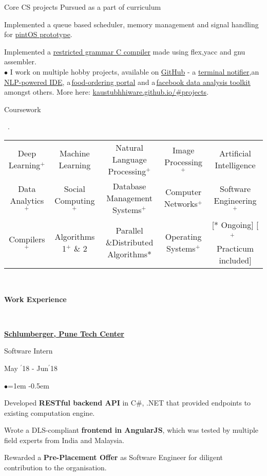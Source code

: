 \documentclass[11pt, a4paper]{resume}
\newcommand{\important}[1]{
  \textcolor{mypurple}{#1}
}
\newcommand{\fillit}[1]{
  \leavevmode\xleaders\hbox{#1}\hfill\kern0pt
}
\newcommand{\sectionTitle}[1]{
  \begin{Large}
      \important{\textbf{#1}} 
    \end{Large}
    \important{\rlap{\rule[.5ex]{\linegoal}{0.5pt}}{}}
     \vspace{0.1em}\\
}
\newcommand{\sectionSubtitleX}[1]{
  \begin{large}
    \important{#1}
    \end{large}
    \fillit{\important{.}}
}
\newcommand{\textbox}[1]{
  \parbox{.333\textwidth}{#1}
}
\newenvironment{Jobsection}[3]{ %
\noindent\textbox{\bf #1\hfill}\textbox{\hfil #2\hfil}\textbox{\hfill #3}
  \begin{list}{$\bullet$}{\leftmargin=1em} %
   \itemsep -0.5em \vspace{-0.5em} %
  }{
  \end{list}
  \vspace{0.2em} %
}
\begin{document}
\begin{rSubsection}{Core CS projects}{\hspace*{\fill} Pursued as a part of curriculum}{}{}
\item Implemented a queue based scheduler, memory management and signal handling for \href{https://github.com/kaustubhhiware/OSLab}{pintOS prototype}.
\item Implemented a \href{https://github.com/kaustubhhiware/cOMPILER}{restricted grammar C compiler} made using flex,yacc and gnu assembler.\\
$\bullet$ I work on multiple hobby projects, available on \href{https://github.com/kaustubhhiware}{GitHub} - a \href{https://github.com/kaustubhhiware/ NotiFyre}{terminal notifier},an\,\href{https://github.com/kaustubhhiware/c0derunR}{ NLP-powered IDE}, a\,\href{https://github.com/kaustubhhiware/Foodspark}{food-ordering portal} and a\,\href{https://github.com/kaustubhhiware/facebook-archive}{facebook data analysis toolkit} amongst others. More here: \href{https://kaustubhhiware.github.io/#projects}{kaustubhhiware.github.io/\#projects}.
\end{rSubsection}

\sectionSubtitleX{Coursework} 
\begin{tabular}{>{\footnotesize}c>{\footnotesize}c>{\footnotesize}c>{\footnotesize}c>{\footnotesize}c}
Deep Learning$^+$ & Machine Learning & Natural Language Processing$^+$ & Image Processing\*$^+$ & Artificial Intelligence \\
Data Analytics$^+$ & Social Computing$^+$ & Database Management Systems$^+$ & Computer Networks$^+$ & Software Engineering$^+$ \\
Compilers$^+$ & Algorithms 1$^+$ \& 2 & Parallel \&Distributed Algorithms* & Operating Systems$^+$ & {\scriptsize [* Ongoing]\,\,[$^+$ \,\,Practicum included]} \\
\end{tabular}\\

\sectionTitle{Work Experience}
\begin{Jobsection}{\href{https://drive.google.com/file/d/1EcfIC_g8bx3whaxMdOkFyZx4TCqA1RAq/view?usp=sharing}{Schlumberger, Pune Tech Center}}{Software Intern}{ May $^{\prime}$18 - Jun$^{\prime}$18}
\item Developed {\bf RESTful backend API} in C\#, .NET that provided endpoints to existing computation engine.
\item Wrote a DLS-compliant {\bf frontend in AngularJS}, which was tested  by multiple field experts from India and Malaysia.
\item Rewarded a {\bf Pre-Placement Offer} as Software Engineer for diligent contribution to the organisation.
\end{Jobsection}
\end{document}
